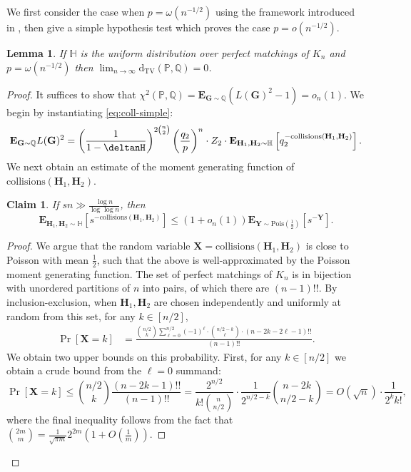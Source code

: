 \documentclass[11pt]{article}
\newcommand{\e}{{\mathbf E}}
\newcommand{\dtv}{\mathrm{d}_{\mathrm{TV}}}
\newcommand{\bG}{\mathbf{G}}
\newcommand{\bH}{\mathbf{H}}
\newcommand{\bX}{\mathbf{X}}
\newcommand{\bY}{\mathbf{Y}}
\newcommand{\bbH}{\mathbb{H}}
\newcommand{\bbP}{\mathbb{P}}
\newcommand{\bbQ}{\mathbb{Q}}
\newtheorem{lem}[thm]{Lemma}
\newtheorem{claim}[thm]{Claim}
\numberwithin{equation}{section}
\numberwithin{thm}{section}
\begin{document}
We first consider the case when $p = \omega(n^{-1/2})$ using the framework introduced in , then give a simple hypothesis test which proves the case $p = o(n^{-1/2})$.
\begin{lem}
If $\bbH$ is the uniform distribution over perfect matchings of $K_n$ and $p = \omega(n^{-1/2})$ then $\lim_{n \to \infty} \dtv(\bbP,\bbQ) = 0$.
\end{lem}

\begin{proof}
It suffices to show that $\chi^2(\bbP,\bbQ) = \e_{\bG \sim \bbQ} (L(\bG)^2 - 1) =o_n(1)$.
We begin by instantiating \cref{eq:coll-simple}:
\begin{equation}\label{eq:coll-simple-matching}
\e_{\bG \sim \bbQ} L(\bG)^2 =
\left(\frac{1}{1-\deltanH}\right)^{2\binom{n}{2}}\left(\frac{q_2}{p}\right)^{n} \cdot Z_2 \cdot \e_{\bH_1,\bH_2 \sim \bbH} \left[q_2^{-\mathrm{collisions}(\bH_1,\bH_2)}\right].
\end{equation}
We next obtain an estimate of the moment generating function of $\mathrm{collisions}(\bH_1,\bH_2)$.
\begin{claim}\label{claim:pois-mgf}
    If $s n \gg \frac{\log n}{\log\log n}$, then
    \[
    \e_{\bH_1,\bH_2 \sim \bbH}\left[s^{-\mathrm{collisions}(\bH_1,\bH_2)}\right] \le \left(1 + o_n(1)\right) \e_{\bY \sim \mathrm{Pois}(\frac{1}{2})}\left[s^{-\bY}\right].
    \]
\end{claim}
\begin{proof}
    
We argue that the random variable $\bX = \mathrm{collisions}(\bH_1,\bH_2)$ is close to Poisson with mean $\frac{1}{2}$, such that the above is well-approximated by the Poisson moment generating function.
The set of perfect matchings of $K_n$ is in bijection with unordered partitions of $n$ into pairs, of which there are $(n-1)!!$.
By inclusion-exclusion, when $\bH_1,\bH_2$ are chosen independently and uniformly at random from this set, for any $k \in [n/2]$,
\begin{align*} 
\Pr [\bX = k] 
&= \frac{\binom{n/2}{k}\sum_{\ell=0}^{n/2} (-1)^\ell \cdot\binom{n/2 - k}{\ell} \cdot (n-2k - 2\ell-1)!!}{(n-1)!!}.
\end{align*}
We obtain two upper bounds on this probability.
First, for any $k \in [n/2]$ we obtain a crude bound from the $\ell=0$ summand:
\[
\Pr[\bX = k]
\le \binom{n/2}{k}\frac{(n-2k-1)!!}{(n-1)!!} 
= \frac{2^{n/2}}{k!\binom{n}{n/2}} \cdot \frac{1}{2^{n/2-k}} \binom{n-2k}{n/2-k} 
= O(\sqrt{n}) \cdot \frac{1}{2^k k!},
\]
where the final inequality follows from the fact that $\binom{2m}{m} = \frac{1}{\sqrt{\pi m }}2^{2m}(1+O(\tfrac{1}{m}))$.


\end{proof}
\end{proof}
\end{document}

